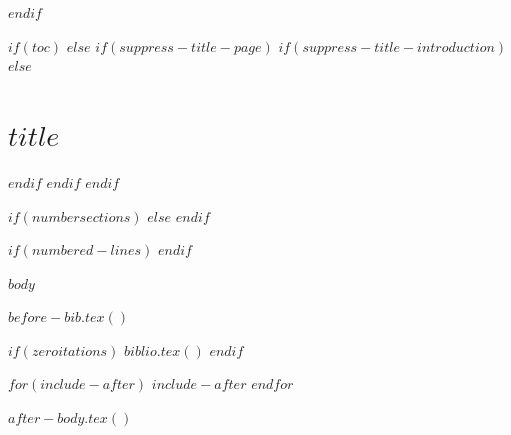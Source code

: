 $endif$


$if(toc)$
$else$
$if(suppress-title-page)$
$if(suppress-title-introduction)$
$else$
\section[Introduction]{$title$}
$endif$
$endif$
$endif$

$if(numbersections)$
\setcounter{secnumdepth}{$if(secnumdepth)$$secnumdepth$$else$5$endif$}
$else$
\setcounter{secnumdepth}{-\maxdimen} %
$endif$

\setlength\LTleft{0pt}

$if(numbered-lines)$
\resetlinenumber[1]
$endif$

$body$

$before-bib.tex()$

$if(zeroitations)$
$biblio.tex()$
$endif$

$for(include-after)$
$include-after$
$endfor$

$after-body.tex()$


